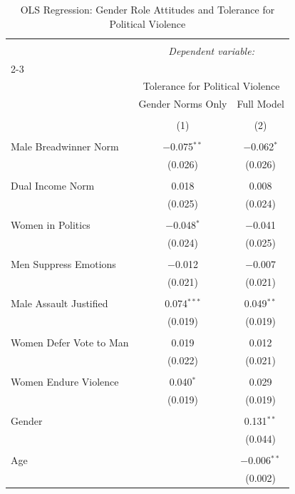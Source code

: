 
\begin{table}[!htbp] \centering 
  \caption{OLS Regression: Gender Role Attitudes and Tolerance for Political Violence} 
  \label{tab:ols} 
\begin{tabular}{@{\extracolsep{5pt}}lcc} 
\\[-1.8ex]\hline 
\hline \\[-1.8ex] 
 & \multicolumn{2}{c}{\textit{Dependent variable:}} \\ 
\cline{2-3} 
\\[-1.8ex] & \multicolumn{2}{c}{Tolerance for Political Violence} \\ 
 & Gender Norms Only & Full Model \\ 
\\[-1.8ex] & (1) & (2)\\ 
\hline \\[-1.8ex] 
 Male Breadwinner Norm & $-$0.075$^{**}$ & $-$0.062$^{*}$ \\ 
  & (0.026) & (0.026) \\ 
  & & \\ 
 Dual Income Norm & 0.018 & 0.008 \\ 
  & (0.025) & (0.024) \\ 
  & & \\ 
 Women in Politics & $-$0.048$^{*}$ & $-$0.041 \\ 
  & (0.024) & (0.025) \\ 
  & & \\ 
 Men Suppress Emotions & $-$0.012 & $-$0.007 \\ 
  & (0.021) & (0.021) \\ 
  & & \\ 
 Male Assault Justified & 0.074$^{***}$ & 0.049$^{**}$ \\ 
  & (0.019) & (0.019) \\ 
  & & \\ 
 Women Defer Vote to Man & 0.019 & 0.012 \\ 
  & (0.022) & (0.021) \\ 
  & & \\ 
 Women Endure Violence  & 0.040$^{*}$ & 0.029 \\ 
  & (0.019) & (0.019) \\ 
  & & \\ 
 Gender &  & 0.131$^{**}$ \\ 
  &  & (0.044) \\ 
  & & \\ 
 Age &  & $-$0.006$^{**}$ \\ 
  &  & (0.002) \\ 

\end{tabular}
\end{table}
